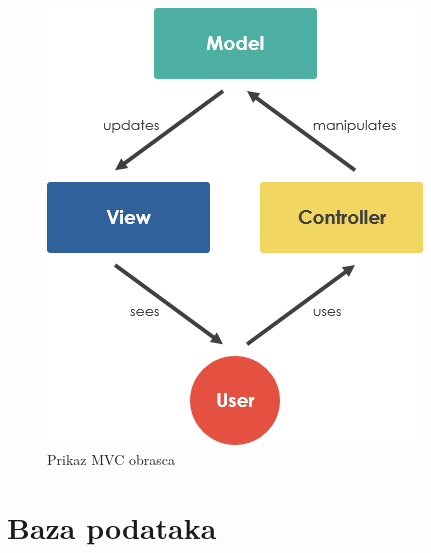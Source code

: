 \begin{figure} [H]

	\includegraphics[width=1\linewidth]{slike/mvc.png}
	\centering
	\caption{Prikaz MVC obrasca}
	\label{fig:Prikaz MVC obrasca}
\end{figure}

\section{Baza podataka}

